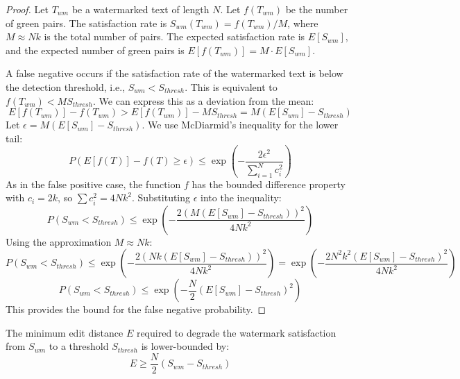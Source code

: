\begin{proof}
Let $T_{wm}$ be a watermarked text of length $N$. Let $f(T_{wm})$ be the number of green pairs. The satisfaction rate is $S_{wm}(T_{wm}) = f(T_{wm})/M$, where $M \approx Nk$ is the total number of pairs. The expected satisfaction rate is $E[S_{wm}]$, and the expected number of green pairs is $E[f(T_{wm})] = M \cdot E[S_{wm}]$.

A false negative occurs if the satisfaction rate of the watermarked text is below the detection threshold, i.e., $S_{wm} < S_{thresh}$. This is equivalent to $f(T_{wm}) < M S_{thresh}$.
We can express this as a deviation from the mean:
$$E[f(T_{wm})] - f(T_{wm}) > E[f(T_{wm})] - M S_{thresh} = M(E[S_{wm}] - S_{thresh})$$
Let $\epsilon = M(E[S_{wm}] - S_{thresh})$. We use McDiarmid's inequality for the lower tail:
$$P(E[f(T)] - f(T) \ge \epsilon) \le \exp\left( -\frac{2\epsilon^2}{\sum_{i=1}^N c_i^2} \right)$$
As in the false positive case, the function $f$ has the bounded difference property with $c_i=2k$, so $\sum c_i^2 = 4Nk^2$.
Substituting $\epsilon$ into the inequality:
$$P(S_{wm} < S_{thresh}) \le \exp\left( -\frac{2(M(E[S_{wm}] - S_{thresh}))^2}{4Nk^2} \right)$$
Using the approximation $M \approx Nk$:
$$P(S_{wm} < S_{thresh}) \le \exp\left( -\frac{2(Nk(E[S_{wm}] - S_{thresh}))^2}{4Nk^2} \right) = \exp\left( -\frac{2N^2k^2(E[S_{wm}] - S_{thresh})^2}{4Nk^2} \right)$$
$$P(S_{wm} < S_{thresh}) \le \exp\left( -\frac{N}{2}(E[S_{wm}] - S_{thresh})^2 \right)$$
This provides the bound for the false negative probability.
\end{proof}

\begin{theorem}
The minimum edit distance $E$ required to degrade the watermark satisfaction from $S_{wm}$ to a threshold $S_{thresh}$ is lower-bounded by:
$$E \ge \frac{N}{2} (S_{wm} - S_{thresh})$$
\end{theorem}

